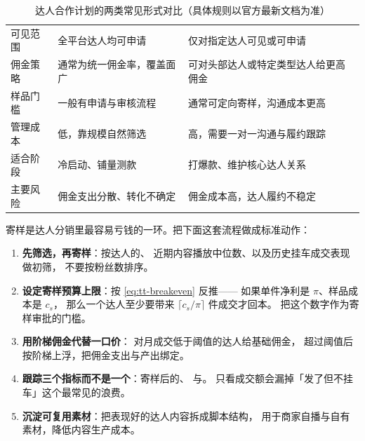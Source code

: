 \begin{table}[htbp]
\centering
\caption{达人合作计划的两类常见形式对比（具体规则以官方最新文档为准）}
\label{tab:tt-plan}
\small
\begin{tabularx}{\textwidth}{L{2.5cm} Y Y}
\toprule
{} &  &  \\
\midrule
可见范围 & 全平台达人均可申请 & 仅对指定达人可见或可申请 \\
\addlinespace
佣金策略 & 通常为统一佣金率，覆盖面广 & 可对头部达人或特定类型达人给更高佣金 \\
\addlinespace
样品门槛 & 一般有申请与审核流程 & 通常可定向寄样，沟通成本更高 \\
\addlinespace
管理成本 & 低，靠规模自然筛选 & 高，需要一对一沟通与履约跟踪 \\
\addlinespace
适合阶段 & 冷启动、铺量测款 & 打爆款、维护核心达人关系 \\
\addlinespace
主要风险 & 佣金支出分散、转化不确定 & 佣金成本高，达人履约不稳定 \\
\bottomrule
\end{tabularx}
\end{table}

\begin{toolbox}[达人分销的样品投放清单]
寄样是达人分销里最容易亏钱的一环。把下面这套流程做成标准动作：
\begin{enumerate}
  \item \textbf{先筛选，再寄样}：按达人的、
        近期内容播放中位数、以及历史挂车成交表现做初筛，
        不要按粉丝数排序。
  \item \textbf{设定寄样预算上限}：按 \cref{eq:tt-breakeven} 反推——
        如果单件净利是 $\pi$、样品成本是 $c_{s}$，
        那么一个达人至少要带来 $\lceil c_{s}/\pi \rceil$ 件成交才回本。
        把这个数字作为寄样审批的门槛。
  \item \textbf{用阶梯佣金代替一口价}：
        对月成交低于阈值的达人给基础佣金，
        超过阈值后按阶梯上浮，把佣金支出与产出绑定。
  \item \textbf{跟踪三个指标而不是一个}：寄样后的、
        与。
        只看成交额会漏掉「发了但不挂车」这个最常见的浪费。
  \item \textbf{沉淀可复用素材}：把表现好的达人内容拆成脚本结构，
        用于商家自播与自有素材，降低内容生产成本。
\end{enumerate}
\end{toolbox}

